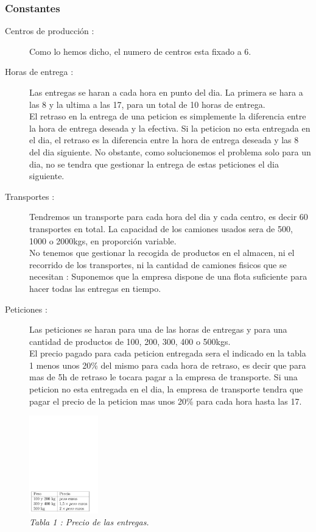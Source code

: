\documentclass{article}
\begin{document}
\subsubsection{Constantes}
\begin{description}
\item[Centros de producción :] Como lo hemos dicho, el numero de centros esta 
fixado a 6.
\item[Horas de entrega :] Las entregas se haran a cada hora en punto del dia. La
primera se hara a las 8 y la ultima a las 17, para un total de 10 horas de
entrega.\\
El retraso en la entrega de una peticion es simplemente la diferencia entre la
hora de entrega deseada y la efectiva. Si la peticion no esta entregada en el
dia, el retraso es la diferencia entre la hora de entrega deseada y las 8 del
dia siguiente. No obstante, como solucionemos el problema solo para un dia, no
se tendra que gestionar la entrega de estas peticiones el dia siguiente.
\item[Transportes :] Tendremos un transporte para cada hora del dia y cada
centro, es decir 60 transportes en total. La capacidad de los camiones usados
sera de 500, 1000 o 2000kgs, en proporción variable.\\
No tenemos que gestionar la recogida de productos en el almacen, ni el recorrido
de los transportes, ni la cantidad de camiones fisicos que se necesitan :
Suponemos que la empresa dispone de una flota suficiente para hacer todas las
entregas en tiempo.
\item[Peticiones :] Las peticiones se haran para una de las horas de entregas y
para una cantidad de productos de 100, 200, 300, 400 o 500kgs.\\
El precio pagado para cada peticion entregada sera el indicado en la tabla 1
menos unos 20\% del mismo para cada hora de retraso, es decir que para mas de 5h
de retraso le tocara pagar a la empresa de transporte. Si una peticion no esta
entregada en el dia, la empresa de transporte tendra que pagar el precio de la
peticion mas unos 20\% para cada hora hasta las 17.
\begin{center}
\includegraphics[width=3cm]{preciosEntregas}\\
{\it Tabla 1 : Precio de las entregas.} \end{center}
\end{description}
\end{document}
